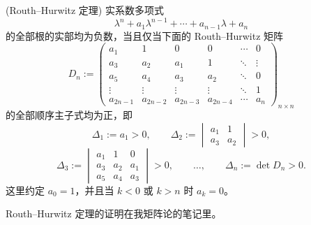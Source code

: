 \begin{theorem}(Routh--Hurwitz 定理)\label{thm:RouthHurwitz定理}
	实系数多项式
	\[
		\lambda^n+a_1\lambda^{n-1}+\cdots
		+a_{n-1}\lambda+a_n
	\]
	的全部根的实部均为负数，当且仅当下面的 Routh--Hurwitz 矩阵
	\[
		D_n\mathrel{:=}
		\begin{pmatrix}
			a_1&1&0&0&\cdots&0\\
			a_3&a_2&a_1&1&\ddots&\vdots\\
			a_5&a_4&a_3&a_2&\ddots&0\\
			\vdots&\vdots&\vdots&\vdots&\ddots&1\\
			a_{2n-1}&a_{2n-2}&a_{2n-3}&a_{2n-4}&\cdots&a_n
		\end{pmatrix}_{n\times n}
	\]
	的全部顺序主子式均为正，即
	\[
		\Delta_1\mathrel{:=}a_1>0,
		\qquad
		\Delta_2\mathrel{:=}
		\begin{vmatrix}
			a_1&1\\
			a_3&a_2
		\end{vmatrix}>0,
	\]
	\[
		\Delta_3\mathrel{:=}
		\begin{vmatrix}
			a_1&1&0\\
			a_3&a_2&a_1\\
			a_5&a_4&a_3
		\end{vmatrix}>0,
		\qquad \ldots,
		\qquad
		\Delta_n\mathrel{:=}\det D_n>0.
	\]
	这里约定 $a_0=1$，并且当 $k<0$ 或 $k>n$ 时 $a_k=0$。
\end{theorem}

Routh--Hurwitz 定理的证明在我矩阵论的笔记里。

